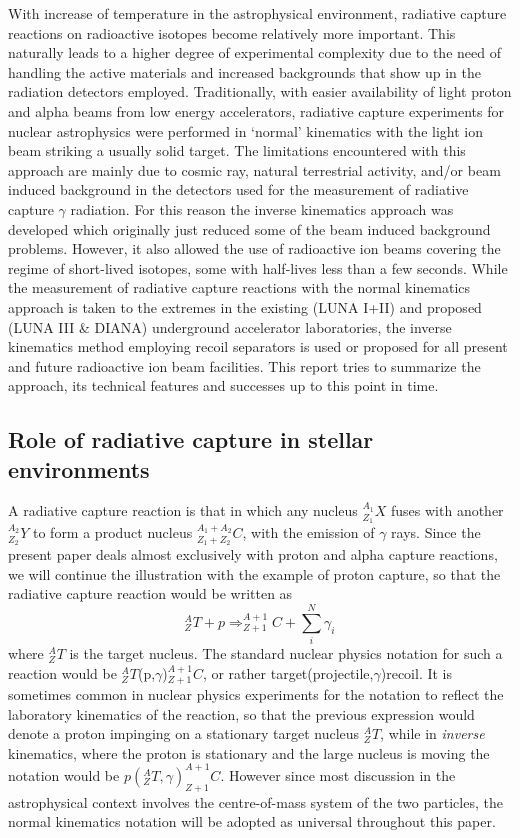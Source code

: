 With increase of temperature in the astrophysical environment, radiative capture reactions on radioactive isotopes become relatively more important. This naturally leads to a higher degree of experimental complexity due to the need of handling the active materials and increased backgrounds that show up in the radiation detectors employed. Traditionally, with easier availability of light proton and alpha beams from low energy accelerators, radiative capture experiments for nuclear astrophysics were performed in `normal' kinematics with the light ion beam striking a usually solid target. The limitations encountered with this approach are mainly due to cosmic ray, natural terrestrial activity, and/or beam induced background in the detectors used for the measurement of radiative capture $\gamma$ radiation. For this reason the inverse kinematics approach was developed which originally just reduced some of the beam induced background problems. However, it also allowed the use of radioactive ion beams covering the regime of short-lived isotopes, some with half-lives less than a few seconds. While the measurement of radiative capture reactions with the normal kinematics approach is taken to the extremes in the existing (LUNA I+II) and proposed (LUNA III \& DIANA) underground accelerator laboratories, the inverse kinematics method employing recoil separators is used or proposed for all present and future radioactive ion beam facilities. This report tries to summarize the approach, its technical features and successes up to this point in time.


\subsection{Role of radiative capture in stellar environments}
\label{role}

A radiative capture reaction is that in which any nucleus $^{A_{1}}_{Z_{1}}X$ fuses with another $^{A_{2}}_{Z_{2}}Y$ to form a product nucleus $^{A_{1}+A_{2}}_{Z_{1}+Z_{2}}C$, with the emission of $\gamma$ rays. Since the present paper deals almost exclusively with proton and alpha capture reactions, we will continue the illustration with the example of proton capture, so that the radiative capture reaction would be written as
\begin{equation}
^{A}_{Z}T+p\Rightarrow^{A+1}_{Z+1}C+\sum_{i}^{N}{\gamma_{i}}
\end{equation}
where $^{A}_{Z}T$ is the target nucleus. The standard nuclear physics notation for such a reaction would be $^{A}_{Z}T$(p,$\gamma$)$^{A+1}_{Z+1}C$, or rather target(projectile,$\gamma$)recoil. It is sometimes common in nuclear physics experiments for the notation to reflect the laboratory kinematics of the reaction, so that the previous expression would denote a proton impinging on a stationary target nucleus $^{A}_{Z}T$, while in {\it inverse} kinematics, where the proton is stationary and the large nucleus is moving the notation would be $p(^{A}_{Z}T,\gamma)^{A+1}_{Z+1}C$. However since most discussion in the astrophysical context involves the centre-of-mass system of the two particles, the normal kinematics notation will be adopted as universal throughout this paper. 


